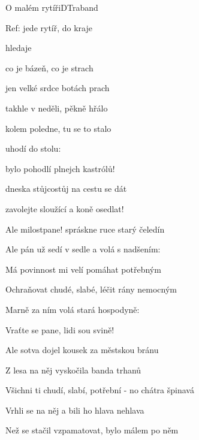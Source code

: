 \begin{song}{O malém rytíři}{D}{Traband}

\begin{SBChorus}

Ref:  jede rytíř,  do kraje

  hledaje

 co je bázeň,  co je strach

 jen velké srdce  botách prach

\end{SBChorus}

\begin{SBVerse}

 takhle v neděli,  pěkně hřálo

 kolem poledne,  tu se to stalo

 uhodí  do stolu:

bylo pohodlí plnejch kastrólů!

 dneska stůjcostůj  na cestu se dát

 zavolejte sloužící a  koně osedlat!

\end{SBVerse}

\begin{SBVerse}

Ale milostpane! spráskne ruce starý čeledín

Ale pán už sedí v sedle a volá s nadšením:

Má povinnost mi velí pomáhat potřebným

Ochraňovat chudé, slabé, léčit rány nemocným

Marně za ním volá stará hospodyně:

Vraťte se pane, lidi sou svině!

\end{SBVerse}

\begin{SBVerse}

Ale sotva dojel kousek za městskou bránu

Z lesa na něj vyskočila banda trhanů

Všichni ti chudí, slabí, potřební - no chátra špinavá

Vrhli se na něj a bili ho hlava nehlava

Než se stačil vzpamatovat, bylo málem po něm


\end{SBVerse}
\end{song}
